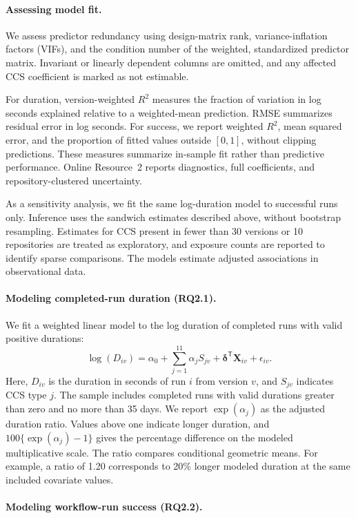 \documentclass[smallextended]{svjour3}
\begin{document}
\paragraph{Assessing model fit.}
We assess predictor redundancy using design-matrix rank, variance-inflation factors (VIFs), and the condition number of the weighted, standardized predictor matrix. Invariant or linearly dependent columns are omitted, and any affected CCS coefficient is marked as not estimable.

For duration, version-weighted $R^2$ measures the fraction of variation in log seconds explained relative to a weighted-mean prediction. RMSE summarizes residual error in log seconds. For success, we report weighted $R^2$, mean squared error, and the proportion of fitted values outside $[0,1]$, without clipping predictions. These measures summarize in-sample fit rather than predictive performance. Online Resource~2 reports diagnostics, full coefficients, and repository-clustered uncertainty.

As a sensitivity analysis, we fit the same log-duration model to successful runs only. Inference uses the sandwich estimates described above, without bootstrap resampling. Estimates for CCS present in fewer than 30 versions or 10 repositories are treated as exploratory, and exposure counts are reported to identify sparse comparisons. The models estimate adjusted associations in observational data.

\paragraph{Modeling completed-run duration (RQ2.1).}

We fit a weighted linear model to the log duration of completed runs with valid positive durations:
\[
\log(D_{iv}) = \alpha_0 + \sum_{j=1}^{11}\alpha_j S_{jv} + \boldsymbol{\delta}^{\mathsf{T}}\mathbf{X}_{iv} + \epsilon_{iv}.
\]
Here, $D_{iv}$ is the duration in seconds of run $i$ from version $v$, and $S_{jv}$ indicates CCS type $j$. The sample includes completed runs with valid durations greater than zero and no more than 35 days. We report $\exp(\alpha_j)$ as the adjusted duration ratio. Values above one indicate longer duration, and $100\{\exp(\alpha_j)-1\}$ gives the percentage difference on the modeled multiplicative scale. The ratio compares conditional geometric means. For example, a ratio of 1.20 corresponds to 20\% longer modeled duration at the same included covariate values.

\paragraph{Modeling workflow-run success (RQ2.2).}
\end{document}
